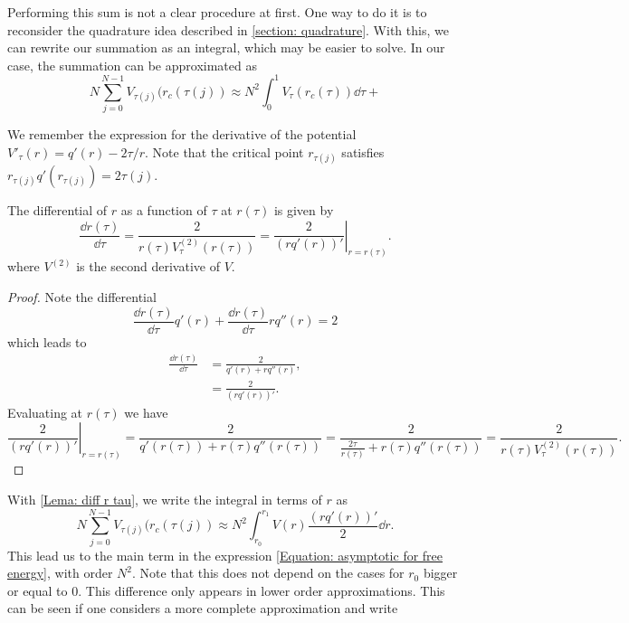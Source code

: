 Performing this sum is not a clear procedure at first. One way to do it is to  reconsider the quadrature idea described in \autoref{section: quadrature}. With this, we can rewrite our summation as an integral, which may be easier to solve. In our case, the summation can be approximated as
\begin{equation}
	N \sum_{j=0}^{N-1} V_{\tau(j)}(r_c(\tau(j)) \approx N^2 \int_{0}^{1} V_{\tau}(r_c(\tau)) \dd \tau + 
\end{equation}

We remember the expression for the derivative of the potential $V'_\tau(r) = q'(r) - 2\tau/r$. Note that the critical point $r_{\tau(j)}$ satisfies $r_{\tau(j)} q'(r_{\tau(j)}) = 2 \tau(j)$. 

\begin{lema}	\label{Lema: diff r tau}
	The differential of $r$ as a function of $\tau$ at $r(\tau)$ is given by
	\begin{equation}
		\frac{\dd r(\tau)}{\dd \tau} = \frac{2}{r(\tau) V^{(2)}_\tau(r(\tau))} = \left. \frac{2}{(r q'(r))'} \right|_{r = r(\tau)}.
		\label{Equation: differential}
	\end{equation}
	where $V^{(2)}$ is the second derivative of $V$.
\end{lema}
\begin{proof}
	Note the differential
	\begin{equation}
		\frac{\dd r(\tau)}{\dd \tau} q'(r) + \frac{\dd r(\tau)}{\dd \tau} r q''(r) = 2
	\end{equation}
	which leads to
	\begin{align}
		\frac{\dd r(\tau)}{\dd \tau} & = \frac{2}{q'(r) + rq''(r)}, \\ & = \frac{2}{(r q'(r))'}.
	\end{align}
	Evaluating at $r(\tau)$ we have
	\begin{equation}
		\left. \frac{2}{(r q'(r))'} \right|_{r = r(\tau)} =   \frac{2}{q'(r(\tau)) + r(\tau)q''(r(\tau))} =   \frac{2}{\frac{2\tau}{r(\tau)} + r(\tau)q''(r(\tau))}  =  \frac{2}{r(\tau) V^{(2)}_\tau(r(\tau))}.
	\end{equation}
\end{proof}
With \autoref{Lema: diff r tau}, we write the integral in terms of $r$ as
\begin{equation}
		N \sum_{j=0}^{N-1} V_{\tau(j)}(r_c(\tau(j)) \approx N^2 \int_{r_0}^{r_1} V(r) \frac{(r q'(r))'}{2} \dd r.
\end{equation}
This lead us to the main term in the expression  \eqref{Equation: asymptotic for free energy}, with order $N^2$. Note that this does not depend on the cases for $r_0$ bigger or equal to $0$. This difference only appears in lower order approximations. This can be seen if one considers a more complete approximation and write

